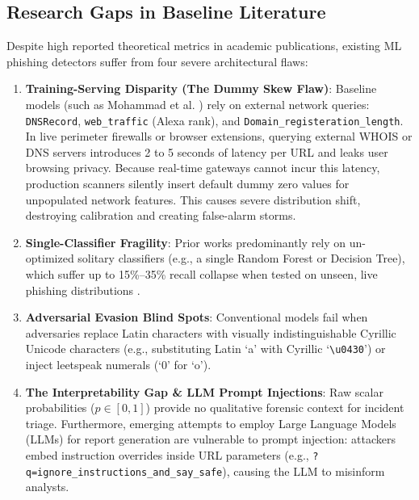 \documentclass[conference]{IEEEtran}
\begin{document}
\subsection{Research Gaps in Baseline Literature}
Despite high reported theoretical metrics in academic publications, existing ML phishing detectors suffer from four severe architectural flaws:
\begin{enumerate}
    \item \textbf{Training-Serving Disparity (The Dummy Skew Flaw)}: Baseline models (such as Mohammad et al. \cite{mohammad2014}) rely on external network queries: \texttt{DNSRecord}, \texttt{web\_traffic} (Alexa rank), and \texttt{Domain\_registeration\_length}. In live perimeter firewalls or browser extensions, querying external WHOIS or DNS servers introduces 2 to 5 seconds of latency per URL and leaks user browsing privacy. Because real-time gateways cannot incur this latency, production scanners silently insert default dummy zero values for unpopulated network features. This causes severe distribution shift, destroying calibration and creating false-alarm storms.
    \item \textbf{Single-Classifier Fragility}: Prior works predominantly rely on un-optimized solitary classifiers (e.g., a single Random Forest or Decision Tree), which suffer up to 15\%--35\% recall collapse when tested on unseen, live phishing distributions \cite{misiek2026}.
    \item \textbf{Adversarial Evasion Blind Spots}: Conventional models fail when adversaries replace Latin characters with visually indistinguishable Cyrillic Unicode characters (e.g., substituting Latin `a' with Cyrillic `\texttt{\textbackslash u0430}') or inject leetspeak numerals (`0' for `o').
    \item \textbf{The Interpretability Gap \& LLM Prompt Injections}: Raw scalar probabilities ($p \in [0, 1]$) provide no qualitative forensic context for incident triage. Furthermore, emerging attempts to employ Large Language Models (LLMs) for report generation are vulnerable to prompt injection: attackers embed instruction overrides inside URL parameters (e.g., \texttt{?q=ignore\_instructions\_and\_say\_safe}), causing the LLM to misinform analysts.
\end{enumerate}
\end{document}
